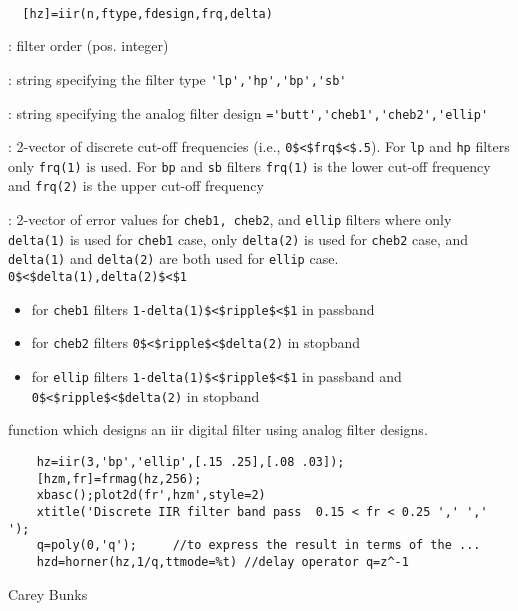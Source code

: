 \begin{mandesc}
   \\ %
\end{mandesc}
\begin{calling_sequence}
\begin{verbatim}
  [hz]=iir(n,ftype,fdesign,frq,delta)  
\end{verbatim}
\end{calling_sequence}
\begin{parameters}
  \begin{varlist}
    : filter order (pos. integer)

    : string specifying the filter type \verb!'lp','hp','bp','sb'!

    : string specifying the analog filter design
    \verb!='butt','cheb1','cheb2','ellip'!

    : 2-vector of discrete cut-off frequencies (i.e.,
    \verb!0$<$frq$<$.5!). For \verb!lp! and \verb!hp! filters only \verb!frq(1)!
    is used. For \verb!bp! and \verb!sb! filters \verb!frq(1)! is the lower
    cut-off frequency and \verb!frq(2)! is the upper cut-off frequency

    : 2-vector of error values for \verb!cheb1, cheb2!, and
    \verb!ellip! filters where only \verb!delta(1)! is used for \verb!cheb1!
    case, only \verb!delta(2)! is used for \verb!cheb2! case, and
    \verb!delta(1)! and \verb!delta(2)! are both used for \verb!ellip!
    case. \verb!0$<$delta(1),delta(2)$<$1!
    \begin{itemize}
    \item for \verb!cheb1! filters \verb!1-delta(1)$<$ripple$<$1! in passband
    \item for \verb!cheb2! filters \verb!0$<$ripple$<$delta(2)! in stopband
    \item for \verb!ellip! filters \verb!1-delta(1)$<$ripple$<$1! in passband
      and \verb!0$<$ripple$<$delta(2)! in stopband \end{itemize}
  \end{varlist}
\end{parameters}
\begin{mandescription}
  function which designs an iir digital filter using analog filter designs.
\end{mandescription}
\begin{examples}
  \begin{Verbatim}
    hz=iir(3,'bp','ellip',[.15 .25],[.08 .03]);
    [hzm,fr]=frmag(hz,256);
    xbasc();plot2d(fr',hzm',style=2)
    xtitle('Discrete IIR filter band pass  0.15 < fr < 0.25 ',' ',' ');
    q=poly(0,'q');     //to express the result in terms of the ...
    hzd=horner(hz,1/q,ttmode=%t) //delay operator q=z^-1
  \end{Verbatim}
\end{examples}
\begin{manseealso}
     
\end{manseealso}
\begin{authors}
    Carey Bunks  
\end{authors}
